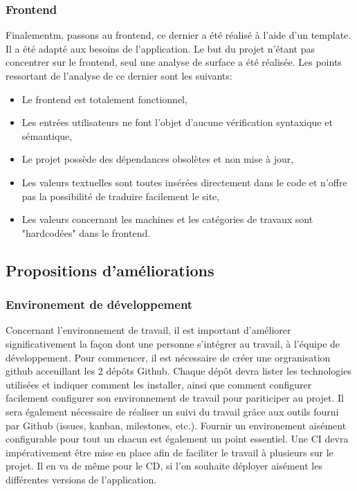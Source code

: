 \documentclass[
    iai, %
    il, %
]{heig-tb}
\begin{document}
\subsubsection{Frontend}
Finalementm, passons au frontend, ce dernier a été réalisé à l'aide d'un template. Il a été adapté aux besoins de l'application. Le but du projet n'étant pas concentrer sur le frontend, seul une analyse de surface a été réalisée.\newline
Les points ressortant de l'analyse de ce dernier sont les suivants:
\begin{itemize}
    \item Le frontend est totalement fonctionnel,
    \item Les entrées utilisateurs ne font l'objet d'aucune vérification syntaxique et sémantique,
    \item Le projet possède des dépendances obsolètes et non mise à jour,
    \item Les valeurs textuelles sont toutes insérées directement dans le code et n'offre pas la possibilité de traduire facilement le site,
    \item Les valeurs concernant les machines et les catégories de travaux sont "hardcodées" dans le frontend.
\end{itemize}

\subsection{Propositions d'améliorations}

\subsubsection{Environement de développement}
Concernant l'environnement de travail, il est important d'améliorer significativement la façon dont une personne s'intégrer au travail, à l'équipe de développement.\newline
Pour commencer, il est nécessaire de créer une orgranisation github acceuillant les 2 dépôts Github. Chaque dépôt devra lister les technologies utilisées et indiquer comment les installer, ainsi que comment configurer facilement configurer son environnement de travail pour pariticiper au projet.\newline
Il sera également nécessaire de réaliser un suivi du travail grâce aux outils fourni par Github (issues, kanban, milestones, etc.).\newline
Fournir un environement aisément configurable pour tout un chacun est également un point essentiel.
Une CI devra impérativement être mise en place afin de faciliter le travail à plusieurs sur le projet. Il en va de même pour le CD, si l'on souhaite déployer aisément les différentes versions de l'application.
\end{document}
